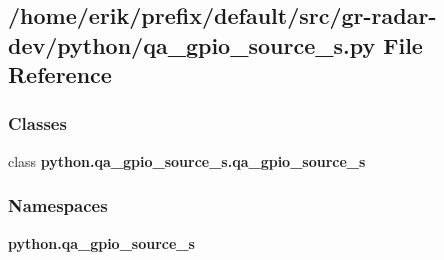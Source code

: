 \subsection{/home/erik/prefix/default/src/gr-\/radar-\/dev/python/qa\+\_\+gpio\+\_\+source\+\_\+s.py File Reference}
\label{qa__gpio__source__s_8py}
\subsubsection*{Classes}
\begin{DoxyCompactItemize}
\item 
class {\bf python.\+qa\+\_\+gpio\+\_\+source\+\_\+s.\+qa\+\_\+gpio\+\_\+source\+\_\+s}
\end{DoxyCompactItemize}
\subsubsection*{Namespaces}
\begin{DoxyCompactItemize}
\item 
 {\bf python.\+qa\+\_\+gpio\+\_\+source\+\_\+s}
\end{DoxyCompactItemize}
